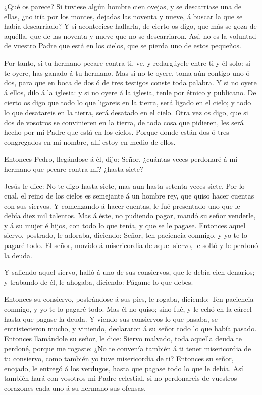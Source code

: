  ¿Qué os parece? Si tuviese algún hombre cien ovejas, y se
descarriase una de ellas, ¿no iría por los montes, dejadas las noventa y
nueve, á buscar la que se había descarriado?  Y si
aconteciese hallarla, de cierto os digo, que más se goza de aquélla, que
de las noventa y nueve que no se descarriaron.  Así, no es
la voluntad de vuestro Padre que está en los cielos, que se pierda uno
de estos pequeños.

 Por tanto, si tu hermano pecare contra ti, ve, y
redargúyele entre ti y él solo: si te oyere, has ganado á tu hermano.
 Mas si no te oyere, toma aún contigo uno ó dos, para que
en boca de dos ó de tres testigos conste toda palabra.  Y
si no oyere á ellos, dilo á la iglesia: y si no oyere á la iglesia,
tenle por étnico y publicano.  De cierto os digo que todo
lo que ligareis en la tierra, será ligado en el cielo; y todo lo que
desatareis en la tierra, será desatado en el cielo.  Otra
vez os digo, que si dos de vosotros se convinieren en la tierra, de toda
cosa que pidieren, les será hecho por mi Padre que está en los cielos.
 Porque donde están dos ó tres congregados en mi nombre,
allí estoy en medio de ellos.

 Entonces Pedro, llegándose á él, dijo: Señor, ¿cuántas
veces perdonaré á mi hermano que pecare contra mí? ¿hasta siete?

 Jesús le dice: No te digo hasta siete, mas aun hasta
setenta veces siete.  Por lo cual, el reino de los cielos
es semejante á un hombre rey, que quiso hacer cuentas con sus siervos.
 Y comenzando á hacer cuentas, le fué presentado uno que le
debía diez mil talentos.  Mas á éste, no pudiendo pagar,
mandó su señor venderle, y á su mujer é hijos, con todo lo que tenía, y
que se le pagase.  Entonces aquel siervo, postrado, le
adoraba, diciendo: Señor, ten paciencia conmigo, y yo te lo pagaré todo.
 El señor, movido á misericordia de aquel siervo, le soltó
y le perdonó la deuda.

 Y saliendo aquel siervo, halló á uno de sus consiervos,
que le debía cien denarios; y trabando de él, le ahogaba, diciendo:
Págame lo que debes.

 Entonces su consiervo, postrándose á sus pies, le rogaba,
diciendo: Ten paciencia conmigo, y yo te lo pagaré todo. 
Mas él no quiso; sino fué, y le echó en la cárcel hasta que pagase la
deuda.  Y viendo sus consiervos lo que pasaba, se
entristecieron mucho, y viniendo, declararon á su señor todo lo que
había pasado.  Entonces llamándole su señor, le dice:
Siervo malvado, toda aquella deuda te perdoné, porque me rogaste:
 ¿No te convenía también á ti tener misericordia de tu
consiervo, como también yo tuve misericordia de ti? 
Entonces su señor, enojado, le entregó á los verdugos, hasta que pagase
todo lo que le debía.  Así también hará con vosotros mi
Padre celestial, si no perdonareis de vuestros corazones cada uno á su
hermano sus ofensas.

